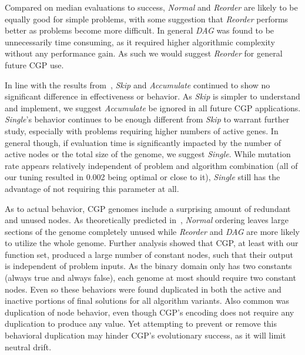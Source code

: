\documentclass[journal]{IEEEtran}
\begin{document}
Compared on median evaluations to success, \emph{Normal} and \emph{Reorder} are
likely to be equally good for simple problems, with some suggestion that \emph{Reorder}
performs better as problems become more difficult.  In general \emph{DAG} was found
to be unnecessarily time consuming, as it required higher algorithmic complexity
without any performance gain.  As such we would suggest \emph{Reorder} for general
future CGP use.

In line with the results from~\cite{goldman:2013:cgpwaste}, \emph{Skip} and
\emph{Accumulate} continued to show no significant difference in effectiveness
or behavior.  As \emph{Skip} is simpler to understand and implement, we suggest
\emph{Accumulate} be ignored in all future CGP applications.  \emph{Single}'s
behavior continues to be enough different from \emph{Skip} to warrant further
study, especially with problems requiring higher numbers of active genes.  In
general though, if evaluation time is significantly impacted by the number of
active nodes or the total size of the genome, we suggest \emph{Single}.  While
mutation rate appears relatively independent of problem and algorithm combination (all of our tuning
resulted in 0.002 being optimal or close to it), \emph{Single} still has the
advantage of not requiring this parameter at all.

As to actual behavior, CGP genomes include a surprising amount of redundant and
unused nodes.  As theoretically predicted in~\cite{goldman:2013:ordering},
\emph{Normal} ordering leaves large sections of the genome completely unused
while \emph{Reorder} and \emph{DAG} are more likely to utilize the whole genome.
Further analysis showed that CGP, at least with our function set, produced a large
number of constant nodes, such that their output is independent of problem
inputs.  As the binary domain only has two constants (always true and always false),
each genome at most should require two constant nodes.  Even so these behaviors
were found duplicated in both the active and inactive portions of final solutions
for all algorithm variants.  Also common was duplication of node behavior, even
though CGP's encoding does not require any duplication to produce any value.  Yet
attempting to prevent or remove this behavioral duplication may hinder CGP's evolutionary
success, as it will limit neutral drift.
\end{document}
